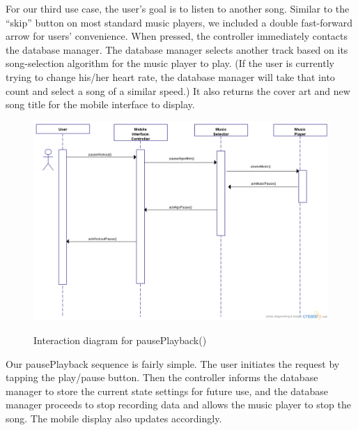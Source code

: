 \documentclass[letterpaper,english, 12pt]{scrreprt}
\begin{document}
For our third use case, the user's goal is to listen to another song. Similar to the ``skip'' button on most standard music players, we included a double fast-forward arrow for users' convenience. When pressed, the controller immediately contacts the database manager. The database manager selects another track based on its song-selection algorithm for the music player to play. (If the user is currently trying to change his/her heart rate, the database manager will take that into count and select a song of a similar speed.) It also returns the cover art and new song title for the mobile interface to display.

\begin{figure}[H]
	\includegraphics[scale=.40]{img/Interaction_Diagrams/newUC4.png}\\
	\caption {Interaction diagram for pausePlayback()} 
\end{figure}

Our pausePlayback sequence is fairly simple. The user initiates the request by tapping the play/pause button. Then the controller informs the database manager to store the current state settings for future use, and the database manager proceeds to stop recording data and allows the music player to stop the song. The mobile display also updates accordingly.
\end{document}
